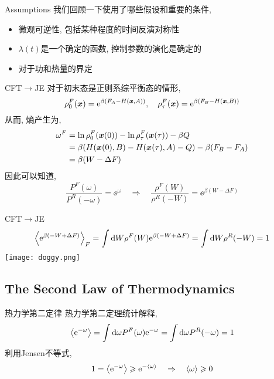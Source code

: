     \begin{frame}{Assumptions}
        我们回顾一下使用了哪些假设和重要的条件,
        \begin{itemize}
            \item 微观可逆性, 包括某种程度的时间反演对称性
            \item $\lambda(t)$是一个确定的函数, 控制参数的演化是确定的
            \item 对于功和热量的界定
        \end{itemize}
    \end{frame}
    \begin{frame}{CFT$\to$JE}
        对于初末态是正则系综平衡态的情形,
        \begin{equation}
            \rho^F_0(\vb*x) = \mathrm{e}^{\beta(F_A - H(\vb*x,A))},\quad \rho^F_\tau(\vb*x) = \mathrm{e}^{\beta(F_B - H(\vb*x,B))}
        \end{equation}
        从而, 熵产生为,
        \begin{equation}
            \begin{split}
                \omega^F &= \ln\rho^F_0(\vb*x(0)) - \ln\rho^F_\tau(\vb*x(\tau)) - \beta Q \\
                &=\beta(H(\vb*x(0),B) - H(\vb*x(\tau),A)-Q) - \beta(F_B-F_A) \\
                &= \beta(W-\Delta F)              
            \end{split}
        \end{equation}
        因此可以知道,
        \begin{equation}
            \frac{P^F(\omega)}{P^R(-\omega)} = \ee^{\omega}\quad\Rightarrow\quad \frac{\rho^F(W)}{\rho^R(-W)} = \ee^{\beta(W - \Delta F)}
        \end{equation}
    \end{frame}
    \begin{frame}{CFT$\to$JE}
        \begin{equation}
            \expval{\mathrm{e}^{\beta( - W + \Delta F)}}_F = \int\dd W\rho^F(W) \mathrm{e}^{\beta( - W + \Delta F)} = \int\dd W\rho^R(-W) = 1
        \end{equation}
        \pause
        \texttt{[image: doggy.png]}
    \end{frame}
    \subsection{The Second Law of Thermodynamics}
    \begin{frame}{热力学第二定律}
        热力学第二定理统计解释, 
        \begin{equation}
            \expval{\mathrm{e}^{-\omega}} = \int\dd \omega P^F(\omega) \mathrm{e}^{-\omega} = \int\dd \omega P^R(-\omega) = 1
        \end{equation}
        利用Jensen不等式,
        \begin{equation}
            1 = \expval{\mathrm{e}^{-\omega}} \geqslant \mathrm{e}^{-\expval{\omega}}\quad\Rightarrow\quad \expval{\omega} \geqslant 0
        \end{equation}
    \end{frame}


